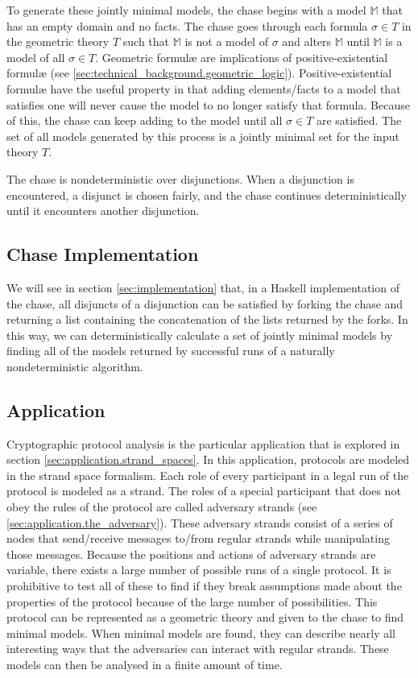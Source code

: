 		To generate these jointly minimal models, the chase begins with a model
		$\mathbb{M}$ that has an empty domain and no facts. The chase goes
		through each formula $\sigma \in T$ in the geometric theory $T$ such that
		$\mathbb{M}$ is not a model of $\sigma$ and alters $\mathbb{M}$ until
		$\mathbb{M}$ is a model of all $\sigma \in T$. Geometric formul{\ae}
		are implications of positive-existential formul{\ae} (see
		\ref{sec:technical_background.geometric_logic}). Positive-existential
		formul{\ae} have the useful property in that adding elements/facts to a
		model that satisfies one will never cause the model to no longer
		satisfy that formula. Because of this, the chase can keep adding to the
		model until all $\sigma \in T$ are satisfied. The set of all models
		generated by this process is a jointly minimal set for the input theory
		$T$.

		The chase is nondeterministic over disjunctions. When a disjunction is
		encountered, a disjunct is chosen fairly, and the chase continues
		deterministically until it encounters another disjunction.

	\subsection{Chase Implementation}

		We will see in section \ref{sec:implementation} that, in a Haskell
		implementation of the chase, all disjuncts of a disjunction can be
		satisfied by forking the chase and returning a list containing the
		concatenation of the lists returned by the forks. In this way, we can
		deterministically calculate a set of jointly minimal models by finding
		all of the models returned by successful runs of a naturally
		nondeterministic algorithm.

	\subsection{Application}

		Cryptographic protocol analysis is the particular application that is
		explored in section \ref{sec:application.strand_spaces}. In this
		application, protocols are modeled in the strand space formalism. Each
		role of every participant in a legal run of the protocol is modeled as
		a strand. The roles of a special participant that does not obey the
		rules of the protocol are called adversary strands (see
		\ref{sec:application.the_adversary}). These adversary strands consist
		of a series of nodes that send/receive messages to/from regular strands
		while manipulating those messages. Because the positions and actions of
		adversary strands are variable, there exists a large number of possible
		runs of a single protocol. It is prohibitive to test all of these to
		find if they break assumptions made about the properties of the
		protocol because of the large number of possibilities. This protocol
		can be represented as a geometric theory and given to the chase to find
		minimal models. When minimal models are found, they can describe nearly
		all interesting ways that the adversaries can interact with regular
		strands. These models can then be analysed in a finite amount of time.
